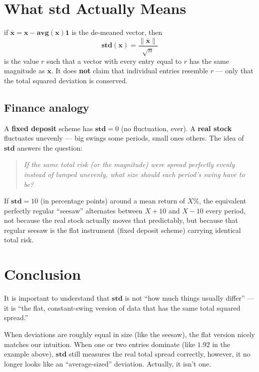 \documentclass[12pt]{article}
\newcommand{\MVec}[1]{\mathbf{#1}}
\begin{document}
\section*{What $\mathbf{std}$ Actually Means}

if $\overline{\MVec{x}} = \MVec{x} - \mathbf{avg}(\MVec{x})\mathbf{1}$
is the de-meaned vector, then
\[
\mathbf{std}(\MVec{x}) = \dfrac{\|\overline{\MVec{x}}\|}{\sqrt n}
\]
is the value $r$ such that a vector with every entry equal
to $r$ has the same magnitude as $\overline{\MVec{x}}$.
It does \textbf{not} claim that individual entries
resemble $r$ --- only that the total squared deviation is conserved.

\subsection*{Finance analogy}
A \textbf{fixed deposit} scheme has $\mathbf{std} = 0$
(no fluctuation, ever). A \textbf{real stock} fluctuates
unevenly --- big swings some periods, small ones others.
The idea of $\mathbf{std}$ answers the question:

\begin{quote}
\emph{If the same total risk (or the magnitude)
were spread perfectly evenly instead of lumped unevenly,
what size should each period's swing have to be?}
\end{quote}

If $\mathbf{std} = 10$ (in percentage points) around a mean
return of $X\%$, the equivalent perfectly regular ``seesaw''
alternates between $X+10$ and $X-10$ every period, not because
the real stock actually moves that predictably, but because that
regular seesaw is the flat instrument (fixed deposit scheme)
carrying identical total risk.

\section*{Conclusion}
It is important to understand that $\mathbf{std}$ is not
``how much things usually differ'' --- it is ``the flat,
constant-swing version of data that has the same total squared
spread.''

When deviations are roughly equal in size (like the seesaw),
the flat version nicely matches our intuition. When one or
two entries dominate (like $1.92$ in the example above),
$\mathbf{std}$ still measures the real total spread correctly,
however, it no longer looks like an ``average-sized'' deviation.
Actually, it isn't one.
\end{document}

